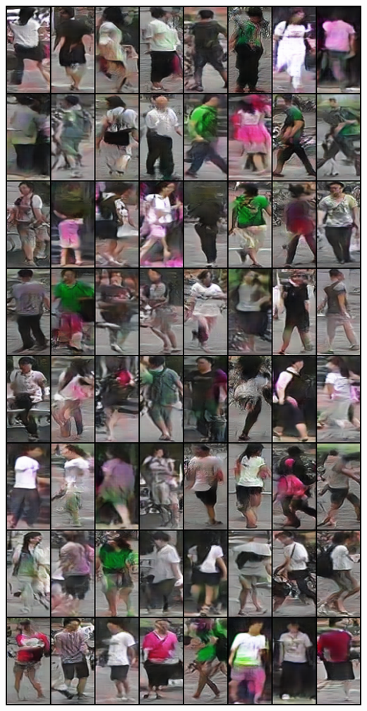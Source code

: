 \documentclass[usenames,dvipsnames,notes]{beamer}
\begin{document}
\begin{frame}
\includegraphics[height=\textheight]{wgan1.png}

\end{frame}
\end{document}
